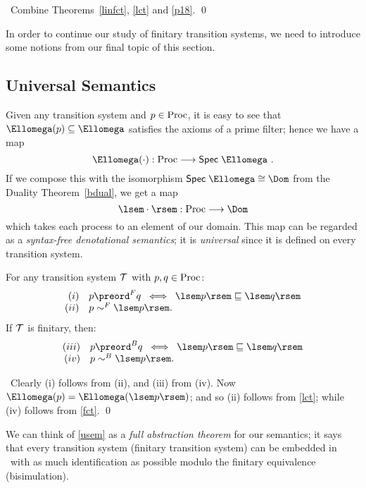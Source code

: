\proof\ Combine Theorems~\ref{linfct}, \ref{lct} and \ref{p18}. \qed

In order to continue our study of finitary transition systems, we need to introduce some notions from our final topic of this section.

\subsection*{Universal Semantics}

Given any transition system and $p \in {\rm Proc}$, it is easy to see that $\Ellomega (p) \subseteq \Ellomega$ satisfies the axioms of a prime filter; hence we have a map
\[ \Ellomega (\cdot ) : {\rm Proc} \longrightarrow {\sf Spec} \; \Ellomega\ . \]
If we compose this with the isomorphism $ {\sf Spec} \; \Ellomega \cong \Dom$ from the Duality Theorem~\ref{bdual}, we get a map
\[ \lsem \cdot \rsem : {\rm Proc} \longrightarrow \Dom \]
which takes each process to an element of our domain.
This map can be regarded as a {\em syntax-free denotational semantics}; it is {\em universal} since it is defined on every transition system.

\begin{theorem} 
\label{usem}
For any transition system ${\cal T}$ with $p, q \in {\rm Proc}$:
\[  \begin{array}{rl}
(i)  & p \preord^{F} q \;\; \Longleftrightarrow \;\; \lsem p \rsem \sqsubseteq \lsem q \rsem \\
(ii) & p \sim^{F} \lsem p \rsem .
\end{array} \]
If ${\cal T}$ is finitary, then:
\[ \begin{array}{rl}
(iii)  & p \preord^{B} q \;\; \Longleftrightarrow \;\; \lsem p \rsem \sqsubseteq \lsem q \rsem \\
(iv) & p \sim^{B} \lsem p \rsem .
\end{array} \] 
\end{theorem}

\proof\ Clearly (i) follows from (ii), and (iii) from (iv).
Now $\Ellomega (p) = \Ellomega (\lsem p \rsem )$; 
and so (ii) follows from \ref{lct}; while (iv) follows from \ref{fct}. \qed

We can think of \ref{usem} as a {\em full abstraction theorem} 
\cite{Mil75,Plo77,Mil77} for our semantics; it says that every transition system (finitary transition system) can be embedded in \Dom\ with as much identification as possible modulo the finitary equivalence (bisimulation).

